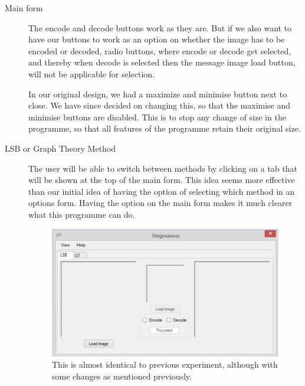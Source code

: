 \begin{description}
\item[Main form]
The encode and decode buttons work as they are. But if we also want to have our buttons to work as an option on whether the image has to be encoded or decoded, radio buttons, where encode or decode get selected, and thereby when decode is selected then the message image load button, will not be applicable for selection. 

In our original design, we had a maximize and minimise button next to close. We have since decided on changing this, so that the maximise and minimise buttons are disabled. This is to stop any change of size in the programme, so that all features of the programme retain their original size.

\item[LSB or Graph Theory Method]
The user will be able to switch between methods by clicking on a tab that will be shown at the top of the main form. This idea seems more effective than our initial idea of having the option of selecting which method in an options form. Having the option on the main form makes it much clearer what this programme can do.

\begin{figure}
	\centering
	\includegraphics[width=1\textwidth]{figures/StegoLSBMain.png}
	\caption{This is almost identical to previous experiment, although with some changes as mentioned previously.}
	\label{fig:StegoLSBMain}
\end{figure}


\end{description}

